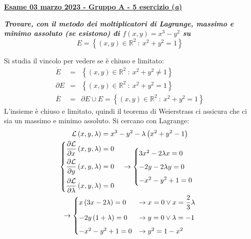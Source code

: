 \documentclass[a4paper]{article}
\newcommand{\definition}[1]{\textcolor{Red3}{\textbf{#1}}}
\newcommand{\example}[1]{\textcolor{Green4}{\textbf{#1}}}
\begin{document}
	\newpage

	\begin{flushleft}
		\label{exam: esame 03 marzo 2023 - Gruppo A - 5 esercizio (a)}
		\hypertarget{
			exam: esame 03 marzo 2023 - Gruppo A - 5 esercizio (a)
		}{
			\definition{\underline{Esame 03 marzo 2023 - Gruppo A - 5 esercizio (\emph{a})}}
		}
	\end{flushleft}
	\example{\emph{Trovare, con il metodo dei moltiplicatori di Lagrange, massimo e minimo assoluto (se esistono) di $f\left(x,y\right) = x^{3}-y^{2}$ su}
	\begin{equation*}
		E = \left\{\left(x,y\right) \in \mathbb{R}^{2} \: : \: x^{2} + y^{2} = 1\right\}
	\end{equation*}}

	\noindent
	Si studia il vincolo per vedere se è chiuso e limitato:
	\begin{equation*}
		\begin{array}{rcl}
			\mathring{E} &=& \left\{\left(x,y\right) \in \mathbb{R}^{2} \: : \: x^{2} + y^{2} \ne 1\right\} \\ [.5em]
			\partial E &=& \left\{\left(x,y\right) \in \mathbb{R}^{2} \: : \: x^{2} + y^{2} = 1\right\} \\ [.5em]
			\overline{E} &=& \partial E \cup E = \left\{\left(x,y\right) \in \mathbb{R}^{2} \: : \: x^{2} + y^{2} = 1\right\}
		\end{array}
	\end{equation*}
	L'insieme è chiuso e limitato, quindi il teorema di Weierstrass ci assicura che ci sia un massimo e minimo assoluto. Si cercano con Lagrange:
	\begin{gather*}
		\mathcal{L}\left(x,y,\lambda\right) = x^{3}-y^{2}-\lambda\left(x^{2}+y^{2}-1\right)
		\\
		\begin{cases}
			\dfrac{\partial \mathcal{L}}{\partial x}\left(x,y,\lambda\right) = 0 \vspace{.5em} \\
			\dfrac{\partial \mathcal{L}}{\partial y}\left(x,y,\lambda\right) = 0 \vspace{.5em} \\
			\dfrac{\partial \mathcal{L}}{\partial \lambda}\left(x,y,\lambda\right) = 0
		\end{cases}
		\rightarrow
		\begin{cases}
			3x^{2} - 2\lambda x = 0 \vspace{.5em} \\
			-2y - 2 \lambda y = 0 \vspace{.5em} \\
			-x^{2}-y^{2}+1 = 0
		\end{cases}
		\\
		\rightarrow
		\begin{cases}
			x\left(3x - 2\lambda\right) = 0	& \rightarrow x = 0 \lor x = \dfrac{2}{3}\lambda \vspace{.5em} \\
			-2y\left(1+\lambda\right) = 0	& \rightarrow y = 0 \lor \lambda = -1 \vspace{.5em} \\
			-x^{2}-y^{2}+1 = 0				& \rightarrow y^{2} = 1-x^{2}
		\end{cases}
	\end{gather*}
\end{document}
